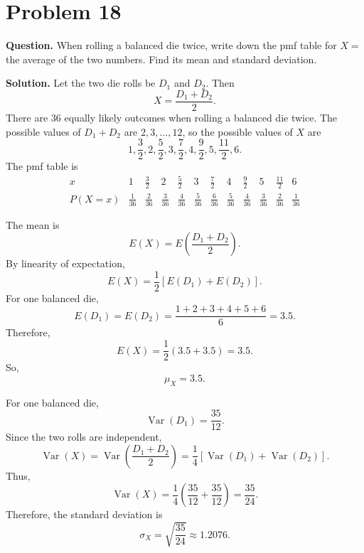 \documentclass[11pt]{article}
\begin{document}
\section*{Problem 18}

\textbf{Question.} When rolling a balanced die twice, write down the pmf table for $X=$ the average of the two numbers. Find its mean and standard deviation.

\textbf{Solution.} Let the two die rolls be $D_1$ and $D_2$. Then
\[
X=\frac{D_1+D_2}{2}.
\]
There are $36$ equally likely outcomes when rolling a balanced die twice. The possible values of $D_1+D_2$ are $2,3,\ldots,12$, so the possible values of $X$ are
\[
1,\frac32,2,\frac52,3,\frac72,4,\frac92,5,\frac{11}{2},6.
\]
The pmf table is
\[
\begin{array}{c|ccccccccccc}
x & 1 & \frac32 & 2 & \frac52 & 3 & \frac72 & 4 & \frac92 & 5 & \frac{11}{2} & 6\\
\hline
P(X=x)
& \frac{1}{36}
& \frac{2}{36}
& \frac{3}{36}
& \frac{4}{36}
& \frac{5}{36}
& \frac{6}{36}
& \frac{5}{36}
& \frac{4}{36}
& \frac{3}{36}
& \frac{2}{36}
& \frac{1}{36}
\end{array}
\]

The mean is
\[
E(X)=E\left(\frac{D_1+D_2}{2}\right).
\]
By linearity of expectation,
\[
E(X)=\frac{1}{2}\left[E(D_1)+E(D_2)\right].
\]
For one balanced die,
\[
E(D_1)=E(D_2)=\frac{1+2+3+4+5+6}{6}=3.5.
\]
Therefore,
\[
E(X)=\frac{1}{2}(3.5+3.5)=3.5.
\]
So,
\[
\boxed{\mu_X=3.5}.
\]

For one balanced die,
\[
\operatorname{Var}(D_1)=\frac{35}{12}.
\]
Since the two rolls are independent,
\[
\operatorname{Var}(X)=\operatorname{Var}\left(\frac{D_1+D_2}{2}\right)=\frac{1}{4}\left[\operatorname{Var}(D_1)+\operatorname{Var}(D_2)\right].
\]
Thus,
\[
\operatorname{Var}(X)=\frac{1}{4}\left(\frac{35}{12}+\frac{35}{12}\right)=\frac{35}{24}.
\]
Therefore, the standard deviation is
\[
\boxed{\sigma_X=\sqrt{\frac{35}{24}}\approx 1.2076}.
\]

\newpage
\end{document}
